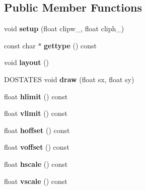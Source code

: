 \subsection*{Public Member Functions}
\begin{DoxyCompactItemize}
\item 
\mbox{\label{struct_u_i_1_1_scroller_aea9e431405fbc2c274468d3f87c950ab}} 
void {\bfseries setup} (float clipw\+\_, float cliph\+\_)
\item 
\mbox{\label{struct_u_i_1_1_scroller_a947d5c914d052ad8a7fe3d901ec10211}} 
const char $\ast$ {\bfseries gettype} () const
\item 
\mbox{\label{struct_u_i_1_1_scroller_a6529982b9fc149aa766ddaef2e4f99c9}} 
void {\bfseries layout} ()
\item 
\mbox{\label{struct_u_i_1_1_scroller_aa6e620f3e4e962800981283698906435}} 
D\+O\+S\+T\+A\+T\+ES void {\bfseries draw} (float sx, float sy)
\item 
\mbox{\label{struct_u_i_1_1_scroller_a983fbce563c2f792b88e3fced9306fef}} 
float {\bfseries hlimit} () const
\item 
\mbox{\label{struct_u_i_1_1_scroller_ae312cc4b203c650a4d63c4325d02b6f9}} 
float {\bfseries vlimit} () const
\item 
\mbox{\label{struct_u_i_1_1_scroller_a0d8249ffee5fa544f38014236c740489}} 
float {\bfseries hoffset} () const
\item 
\mbox{\label{struct_u_i_1_1_scroller_ab4c4ee6e92f981667cd7dbaff45c6a1c}} 
float {\bfseries voffset} () const
\item 
\mbox{\label{struct_u_i_1_1_scroller_afdb5384477239cdbc16cb66388a77302}} 
float {\bfseries hscale} () const
\item 
\mbox{\label{struct_u_i_1_1_scroller_af00ee15d53f95b1c299fdbd365bec083}} 
float {\bfseries vscale} () const
\item 

\end{DoxyCompactItemize}
